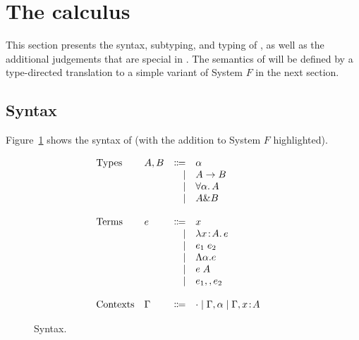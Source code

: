 \section{The \name calculus} \label{sec:fi}

This section presents the syntax, subtyping, and typing of \name, as well as the
additional judgements that are special in \name. The semantics of \name will be
defined by a type-directed translation to a simple variant of System $F$ in the
next section.

\subsection{Syntax}

Figure~\ref{fig:fi-syntax-old} shows the syntax of \name (with the addition to
System $F$ highlighted).


\begin{figure}
  \[
    \begin{array}{l}
      \begin{array}{llrll}
        \text{Types}
        & A, B & \Coloneqq & \alpha                  & \\
        &      & \mid & A \to B                      & \\
        &      & \mid & \forall \alpha. \, A  & \\
        &      & \mid & A \& B               & \\

        \\
        \text{Terms}
        & e & \Coloneqq & x                        & \\
        &   & \mid & \lambda x \!:\! A.\, e                    & \\
        &   & \mid & e_1 \; e_2              & \\
        &   & \mid & \Lambda \alpha. e  & \\
        &   & \mid & e \; A                     & \\
        &   & \mid & e_1 ,, e_2              & \\

        \\
        \text{Contexts}
        & \Gamma & \Coloneqq & \cdot
                   \mid \Gamma, \alpha
                   \mid \Gamma, x \!:\! A  & \\
      \end{array}
    \end{array}
  \]

  \label{fig:fi-syntax-old}
  \caption{Syntax.}
\end{figure}

